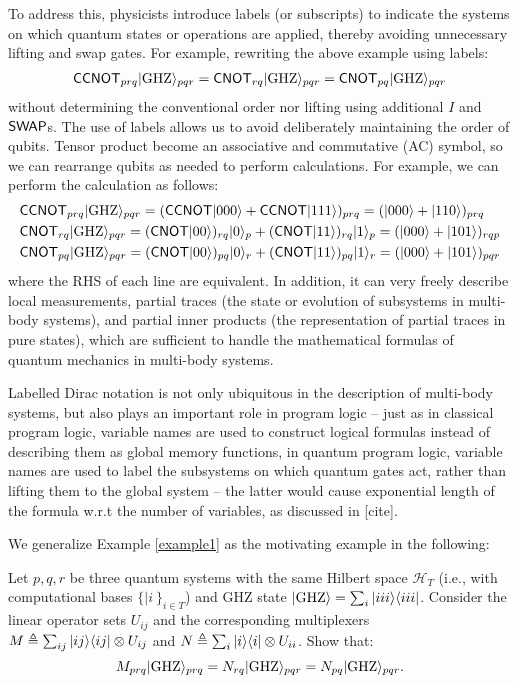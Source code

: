 To address this, physicists introduce labels (or subscripts) to indicate the systems on which quantum states or operations are applied, thereby avoiding unnecessary lifting and swap gates. For example, rewriting the above example using labels:
\begin{align*}
  {\mathsf{CCNOT}}_{prq}|{\mathrm{GHZ}}\rangle_{pqr} = 
  {\mathsf{CNOT}}_{rq}|{\mathrm{GHZ}}\rangle_{pqr}
  = {\mathsf{CNOT}}_{pq}|{\mathrm{GHZ}}\rangle_{pqr}
\end{align*}
without determining the conventional order nor lifting using additional $I$ and ${\mathsf{SWAP}}$s. 
The use of labels allows us to avoid deliberately maintaining the order of qubits. Tensor product become an associative and commutative (AC) symbol, so we can rearrange qubits as needed to perform calculations. For example, we can perform the calculation as follows:
\begin{align*}
  &{\mathsf{CCNOT}}_{prq}|{\mathrm{GHZ}}\rangle_{pqr}
  = ({\mathsf{CCNOT}}|000\rangle + {\mathsf{CCNOT}}|111\rangle)_{prq}
  = (|000\rangle + |110\rangle)_{prq}\\
  &{\mathsf{CNOT}}_{rq}|{\mathrm{GHZ}}\rangle_{pqr}
  = ({\mathsf{CNOT}}|00\rangle)_{rq}|0\rangle_p + ({\mathsf{CNOT}}|11\rangle)_{rq}|1\rangle_p
  =(|000\rangle + |101\rangle)_{rqp}\\
  &{\mathsf{CNOT}}_{pq}|{\mathrm{GHZ}}\rangle_{pqr}
  = ({\mathsf{CNOT}}|00\rangle)_{pq}|0\rangle_r + ({\mathsf{CNOT}}|11\rangle)_{pq}|1\rangle_r
  = (|000\rangle + |101\rangle)_{pqr}
\end{align*}
where the RHS of each line are equivalent.
In addition, it can very freely describe local measurements, partial traces (the state or evolution of subsystems in multi-body systems), and partial inner products (the representation of partial traces in pure states), which are sufficient to handle the mathematical formulas of quantum mechanics in multi-body systems.

Labelled Dirac notation is not only ubiquitous in the description of multi-body systems, but also plays an important role in program logic -- just as in classical program logic, variable names are used to construct logical formulas instead of describing them as global memory functions, in quantum program logic, variable names are used to label the subsystems on which quantum gates act, rather than lifting them to the global system -- the latter would cause exponential length of the formula w.r.t the number of variables, as discussed in [cite].

We generalize Example \ref{example1} as the motivating example in the following:
\begin{example}
  \label{ex: motivating}
  Let $p,q,r$ be three quantum systems with the same Hilbert space \( \mathcal{H}_T \) (i.e., with computational bases $\{|i\>\}_{i\in T}$) and GHZ state $|{\mathrm{GHZ}}\rangle = \sum_i|iii\rangle\langle iii|$. Consider the linear operator sets $U_{ij}$ and the corresponding multiplexers $M\triangleq \sum_{ij}|ij\rangle\langle ij|\otimes U_{ij}$ and $N\triangleq \sum_i|i\rangle\langle i|\otimes U_{ii}$. Show that:
  $$M_{prq}|{\mathrm{GHZ}}\rangle_{prq} = N_{rq}|{\mathrm{GHZ}}\rangle_{pqr} = N_{pq}|{\mathrm{GHZ}}\rangle_{pqr}.$$
\end{example}

